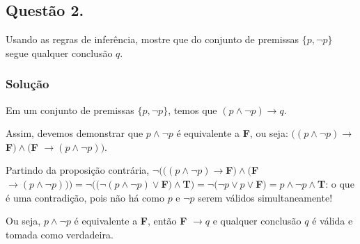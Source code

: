 \documentclass[12pt, letterpaper]{report}
\newcounter{ProblemNum}
\newcommand*{\anyproblem}[1]{\newpage\subsection*{#1}}
\newcommand*{\problem}[1]{\stepcounter{ProblemNum} %
   \anyproblem{Questão #1}}
\newcommand*{\soln}[1]{\subsubsection*{#1}}
\newcommand*{\solution}{\soln{Solução}}
\begin{document}
\problem{2.}
  Usando as regras de inferência, mostre que do conjunto de premissas $ \{p,\lnot p\} $ segue qualquer conclusão $ q $.

\solution
  Em um conjunto de premissas $ \{p,\lnot p\} $, temos que $(p \land \lnot p) \rightarrow q$. 

  Assim, devemos demonstrar que $p \land \lnot p$ é equivalente a \textbf{F}, ou seja: $((p \land \lnot p) \rightarrow $\textbf{F}$) \land ($\textbf{F} $ \rightarrow (p \land \lnot p))$.

  Partindo da proposição contrária, $\lnot(((p \land \lnot p) \rightarrow $\textbf{F}$) \land ($\textbf{F} $ \rightarrow (p \land \lnot p))) = \lnot((\lnot(p \land \lnot p) \lor $\textbf{F}$) \land $\textbf{T}$) = \lnot(\lnot p \lor p \lor $\textbf{F}$) = p \land \lnot p \land $\textbf{T}: o que é uma contradição, pois não há como $p$ e $\lnot p$ serem válidos simultaneamente!

  Ou seja, $p \land \lnot p$ é equivalente a \textbf{F}, então \textbf{F} $\rightarrow q$ e qualquer conclusão $q$ é válida e tomada como verdadeira.
\end{document}
